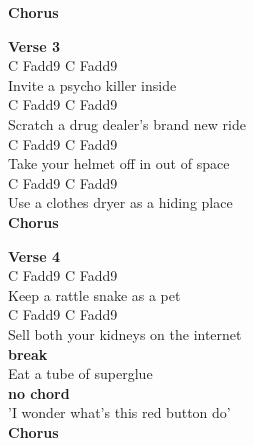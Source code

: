 \documentclass[a4paper]{article}
\begin{document}
{{        }
        \textbf{Chorus}
        ~\\
        {
            \cutive
            \obeyspaces

        }
        \textbf{Verse 3}
        ~\\
        {
            \cutive
            \obeyspaces
         C      Fadd9    C    Fadd9
\\
Invite a psycho killer inside
\\
          C             Fadd9     C    Fadd9
\\
Scratch a drug dealer's brand new ride
\\
          C          Fadd9     C    Fadd9
\\
Take your helmet off in out of space
\\
      C                Fadd9    C    Fadd9
\\
Use a clothes dryer as a hiding place
\\

        }
        \textbf{Chorus}
        ~\\
        {
            \cutive
            \obeyspaces

        }
        \textbf{Verse 4}
        ~\\
        {
            \cutive
            \obeyspaces
       C           Fadd9 C    Fadd9
\\
Keep a rattle snake as a pet
\\
     C                 Fadd9       C    Fadd9
\\
Sell both your kidneys on the internet
\\

        }
        \textbf{break}
        ~\\
        {
            \cutive
            \obeyspaces
  Eat a tube of superglue 
\\

        }
        \textbf{no chord}
        ~\\
        {
            \cutive
            \obeyspaces
'I wonder what's this red button do'
\\

        }
        \textbf{Chorus}
        ~\\
        {
            \cutive
            \obeyspaces

}}
\end{document}
